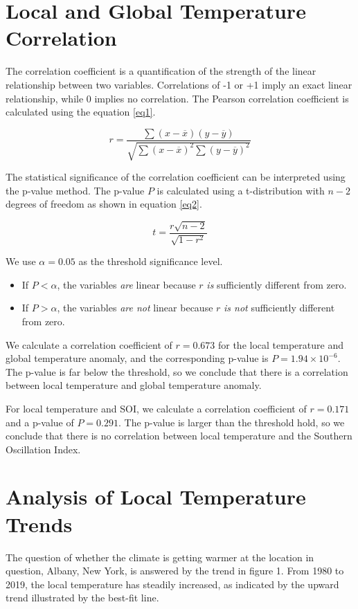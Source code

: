 \documentclass[12pt]{article}
\begin{document}
\section*{Local and Global Temperature Correlation}
The correlation coefficient is a quantification of the
strength of the linear relationship between two variables.
Correlations of -1 or +1 imply an exact linear relationship,
while 0 implies no correlation.
The Pearson correlation coefficient is calculated using
the equation \ref{eq1}.

\begin{equation}\label{eq1}
 r = \frac{\sum (x - \overline{x}) (y - \overline{y})}
 {\sqrt{\sum (x - \overline{x})^2 \sum (y - \overline{y})^2}}
\end{equation}

The statistical significance of the correlation coefficient can be
interpreted using the p-value method.
The p-value $P$ is calculated using a t-distribution with
$n - 2$ degrees of freedom as shown in equation \ref{eq2}.

\begin{equation}\label{eq2}
 t = \frac{r \sqrt{n-2}}{\sqrt{1 - r^2}}
\end{equation}

We use $\alpha = 0.05$ as the threshold significance level.
\begin{itemize}
 \item If $P < \alpha$, the variables \textit{are}
 linear because $r$ \textit{is} sufficiently different from zero.
 \item If $P > \alpha$, the variables \textit{are not}
 linear because $r$ \textit{is not} sufficiently different from zero.
\end{itemize}

We calculate a correlation coefficient of $r = 0.673$ for
the local temperature and global temperature anomaly,
and the corresponding p-value is $P = 1.94 \times 10^{-6}$.
The p-value is far below the threshold, so we conclude that
there is a correlation between local temperature and
global temperature anomaly.

For local temperature and SOI, we calculate a correlation
coefficient of $r = 0.171$ and a p-value of $P = 0.291$.
The p-value is larger than the threshold hold, so we
conclude that there is no correlation between local temperature
and the Southern Oscillation Index.

\section*{Analysis of Local Temperature Trends}
The question of whether the climate is getting warmer at the
location in question, Albany, New York, is answered by
the trend in figure 1.
From 1980 to 2019, the local temperature has steadily increased,
as indicated by the upward trend illustrated by the best-fit line.
\end{document}

